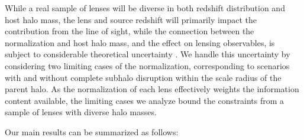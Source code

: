 While a real sample of lenses will be diverse in both redshift distribution and host halo mass, the lens and source redshift will primarily impact the contribution from the line of sight, while the connection between the normalization and host halo mass, and the effect on lensing observables, is subject to considerable theoretical uncertainty \citep{DespVeg16,GK++17}. We handle this uncertainty by considering two limiting cases of the normalization, corresponding to scenarios with and without complete subhalo disruption within the scale radius of the parent halo. As the normalization of each lens effectively weights the information content available, the limiting cases we analyze bound the constraints from a sample of lenses with diverse halo masses.

Our main results can be summarized as follows:

